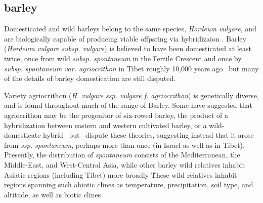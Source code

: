\documentclass[11pt]{article}
\begin{document}
\subsection*{barley}

Domesticated and wild barleys belong to the same species, \emph{Hordeum vulgare}, and are biologically capable of producing viable offpsring via hybridizaion \cite{von1995ecographical}.
Barley (\emph{Hordeum vulgare subsp. vulgare}) is believed to have been domesticated at least twice, once from wild \emph{subsp. spontaneum} in the Fertile Crescent and once by \emph{subsp. spontaneum var. agriocrithon} in Tibet roughly 10,000 years ago \cite{takahashi1955origin, badr2000origin, oka2012origin, azhaguvel2007phylogenetic, haberer2015barley}\, but many of the details of barley domestication are still disputed.

Variety agriocrithon (\emph{H. vulgare ssp. vulgare f. agriocrithon}) is genetically diverse, and is found throughout much of the range of Barley.
Some have suggested that agriocrithon may be the progenitor of six-rowed barley, the product of a hybridization between eastern and western cultivated barley, or a wild-domesticate hybrid \cite{staudt1961origin, zohary1959hordeum, murphy1982origin}\, but \cite{azhaguvel2007phylogenetic}\ dispute these theories, suggesting instead that it arose from \emph{ssp. spontaneum}, perhaps more than once (in Israel as well as in Tibet).
Presently, the distribution of \emph{spontaneum} consists of the Mediterranean, the Middle-East, and West-Central Asia, while other barley wild relatives inhabit Asiatic regions (including Tibet) more broadly \cite{nevo2010drought, harlan1995living, CWR}\.
These wild relatives inhabit regions spanning such abiotic clines as temperature, precipitation, soil type, and altitude, as well as biotic clines \cite{nevo2010drought}.
\end{document}
